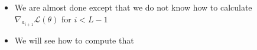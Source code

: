 \begin{frame}
\begin{columns}
\begin{overlayarea}{\textwidth}{\textheight}
      \begin{itemize}
        \item<12-> We are almost done except that we do not know how to calculate $\nabla_{a_{i+1}} \mathscr{L}(\theta)$ for $i < L-1$
        \item<13-> We will see how to compute that
      \end{itemize}
    \end{overlayarea}
    \begin{overlayarea}{\textwidth}{\textheight}
      \makebox[\textwidth][c]{\usebox{\nnhiddencompcontent}}
    \end{overlayarea}
  \end{columns}
\end{frame}


